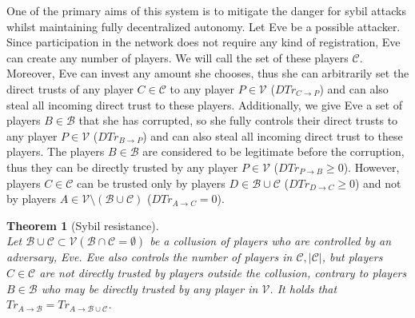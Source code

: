 \documentclass[11pt]{article}
\newtheorem{theorem}{Theorem}[section]
\theoremstyle{definition}
\theoremstyle{corollary}
\theoremstyle{lemma}
\begin{document}
    One of the primary aims of this system is to mitigate the danger for sybil attacks whilst maintaining fully decentralized
    autonomy. Let Eve be a possible attacker. Since participation in the network does not require any kind of registration,
    Eve can create any number of players. We will call the set of these players $\mathcal{C}$. Moreover, Eve can invest any
    amount she chooses, thus she can arbitrarily set the direct trusts of any player $C \in \mathcal{C}$ to any player $P \in
    \mathcal{V}$ ($DTr_{C \rightarrow P}$) and can also steal all incoming direct trust to these players. Additionally, we
    give Eve a set of players $B \in \mathcal{B}$ that she has corrupted, so she fully controls their direct trusts to any
    player $P \in \mathcal{V}$ ($DTr_{B \rightarrow P}$) and can also steal all incoming direct trust to these players. The
    players $B \in \mathcal{B}$ are considered to be legitimate before the corruption, thus they can be directly trusted by
    any player $P \in \mathcal{V}$ ($DTr_{P \rightarrow B} \geq 0$). However, players $C \in \mathcal{C}$ can be trusted only
    by players $D \in \mathcal{B} \cup \mathcal{C}$ ($DTr_{D \rightarrow C} \geq 0$) and not by players $A \in \mathcal{V}
    \setminus (\mathcal{B} \cup \mathcal{C})$ ($DTr_{A \rightarrow C} = 0$).
    \begin{theorem}[Sybil resistance] \ \\
    \label{sybil}
       Let $\mathcal{B} \cup \mathcal{C} \subset \mathcal{V} (\mathcal{B} \cap \mathcal{C} = \emptyset)$ be a collusion of
       players who are controlled by an adversary, Eve. Eve also controls the number of players in $\mathcal{C},
       |\mathcal{C}|$, but players $C \in \mathcal{C}$ are not directly trusted by players outside the collusion, contrary
       to players $B \in \mathcal{B}$ who may be directly trusted by any player in $\mathcal{V}$. It holds that
       $Tr_{A \rightarrow \mathcal{B}} = Tr_{A \rightarrow \mathcal{B} \cup \mathcal{C}}$.
    \end{theorem}
\end{document}
